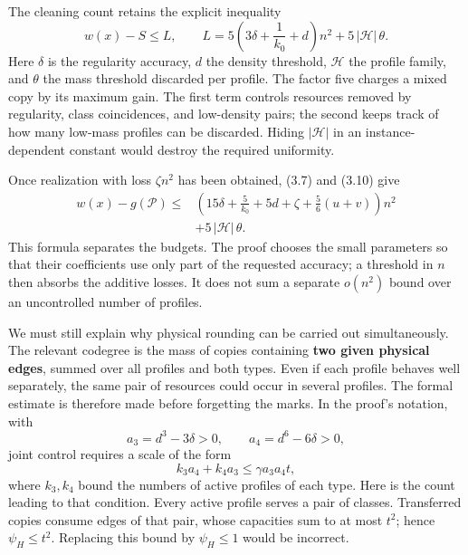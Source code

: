 \documentclass[english,11pt,a4paper]{article}
\begin{document}
The cleaning count retains the explicit inequality \[
w(x)-S\le L,\qquad
L=5\left(3\delta+\frac1{k_0}+d\right)n^2
  +5\,|\mathcal H|\,\theta.
\tag{3.10}
\] Here \(\delta\) is the regularity accuracy, \(d\) the density threshold, \(\mathcal H\) the profile family, and \(\theta\) the mass threshold discarded per profile. The factor five charges a mixed copy by its maximum gain. The first term controls resources removed by regularity, class coincidences, and low-density pairs; the second keeps track of how many low-mass profiles can be discarded. Hiding \(|\mathcal H|\) in an instance-dependent constant would destroy the required uniformity.

Once realization with loss \(\zeta n^2\) has been obtained, (3.7) and (3.10) give \[
\begin{aligned}
w(x)-g(\mathcal P)\le{}&
\left(15\delta+\frac5{k_0}+5d+\zeta
             +\frac56(u+v)\right)n^2\\
&+5\,|\mathcal H|\,\theta .
\end{aligned}
\tag{3.11}
\] This formula separates the budgets. The proof chooses the small parameters so that their coefficients use only part of the requested accuracy; a threshold in \(n\) then absorbs the additive losses. It does not sum a separate \(o(n^2)\) bound over an uncontrolled number of profiles.

We must still explain why physical rounding can be carried out simultaneously. The relevant codegree is the mass of copies containing \textbf{two given physical edges}, summed over all profiles and both types. Even if each profile behaves well separately, the same pair of resources could occur in several profiles. The formal estimate is therefore made before forgetting the marks. In the proof's notation, with \[
a_3=d^3-3\delta>0,\qquad a_4=d^6-6\delta>0,
\] joint control requires a scale of the form \[
k_3a_4+k_4a_3\le\gamma a_3a_4t,
\tag{3.12}
\] where \(k_3,k_4\) bound the numbers of active profiles of each type. Here is the count leading to that condition. Every active profile serves a pair of classes. Transferred copies consume edges of that pair, whose capacities sum to at most \(t^2\); hence \(\psi_H\le t^2\). Replacing this bound by \(\psi_H\le1\) would be incorrect.
\end{document}
